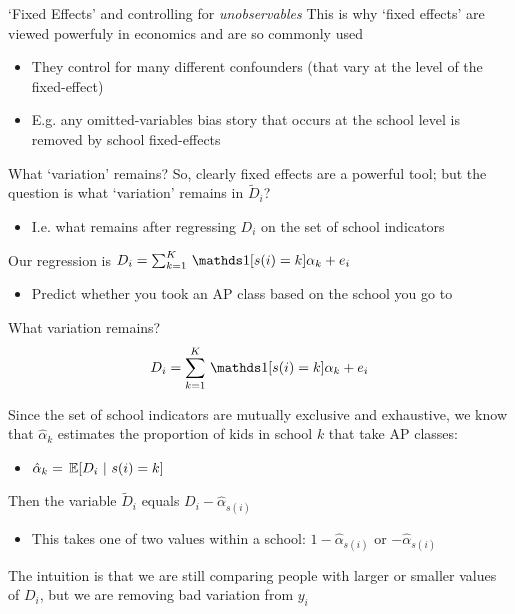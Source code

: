 \documentclass[aspectratio=169,t,11pt,table]{beamer}
\begin{document}
\begin{frame}{`Fixed Effects' and controlling for \emph{unobservables}}
  This is why `fixed effects' are viewed powerfuly in economics and are so commonly used
  \begin{itemize}
    \item They control for many different confounders (that vary at the level of the fixed-effect)
    
    \item E.g. any omitted-variables bias story that occurs at the school level is removed by school fixed-effects
  \end{itemize}
\end{frame}

\begin{frame}{What `variation' remains?}
  So, clearly fixed effects are a powerful tool; but the question is what `variation' remains in $\tilde{D}_i$?
  \begin{itemize}
    \item I.e. what remains after regressing $D_i$ on the set of school indicators
  \end{itemize}

  \bigskip
  Our regression is $D_i = \sum_{k=1}^K \one{s(i) = k} \alpha_k + e_i$
  \begin{itemize}
    \item Predict whether you took an AP class based on the school you go to
  \end{itemize}
\end{frame}

\begin{frame}{What variation remains?}
  \vspace*{-\bigskipamount}
  $$D_i = \sum_{k=1}^K \one{s(i) = k} \alpha_k + e_i$$
  
  Since the set of school indicators are mutually exclusive and exhaustive, we know that $\hat{\alpha}_k$ estimates the proportion of kids in school $k$ that take AP classes: 
  \begin{itemize}
    \item $\hat{\alpha}_k = \expec{D_i}{s(i) = k}$
  \end{itemize}

  \pause
  \bigskip
  Then the variable $\tilde{D}_i$ equals $D_i - \hat{\alpha}_{s(i)}$
  \begin{itemize}
    \item This takes one of two values within a school: $1 - \hat{\alpha}_{s(i)}$ or $- \hat{\alpha}_{s(i)}$
  \end{itemize}

  \bigskip
  The intuition is that we are still comparing people with larger or smaller values of $D_i$, but we are removing bad variation from $y_i$
\end{frame}
\end{document}
